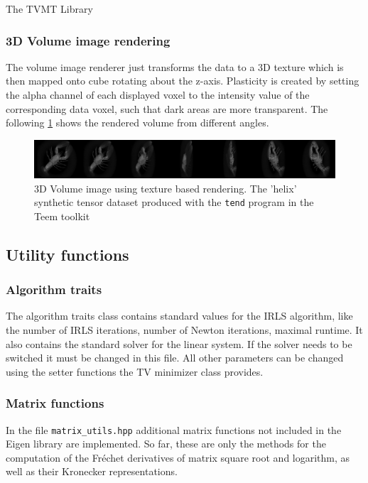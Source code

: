 \begin{chapter}{The TVMT Library}
\FloatBarrier
\subsubsection{3D Volume image rendering} %
\label{ssub:3D Volume image rendering}
The volume image renderer just transforms the data to a 3D texture which is then mapped onto cube rotating about the z-axis.
Plasticity is created by setting the alpha channel of each displayed voxel to the intensity value of the corresponding data voxel, such that dark areas are more transparent.
The following \ref{fig:volume_visualization} shows the rendered volume from different angles.
\begin{figure}[h!]
        \centering
	    \includegraphics[width=1.0\linewidth]{./figures/library/3dvol_seq.png}
	    \caption[3D Volume image renderer]{3D Volume image using texture based rendering. The 'helix' synthetic tensor dataset produced with the \texttt{tend} program in the Teem toolkit\cite{teem}}
	\label{fig:volume_visualization}
\end{figure}


\subsection{Utility functions} %
\label{sub:Utility function}

\subsubsection{Algorithm traits} %
\label{ssub:AlgoTraits}
The algorithm traits class contains standard values for the IRLS algorithm, like the number of IRLS iterations, number of Newton iterations, maximal runtime.
It also contains the standard solver for the linear system. If the solver needs to be switched it must be changed in this file. All other parameters can
be changed using the setter functions the TV minimizer class provides.


\subsubsection{Matrix functions} %
\label{ssub:Matrix functions}
In the file \texttt{matrix\_utils.hpp} additional matrix functions not included in the Eigen library are implemented.
So far, these are only the methods for the computation of the Fr\'{e}chet derivatives of matrix square root and logarithm, as well as their
Kronecker representations.


\end{chapter}
